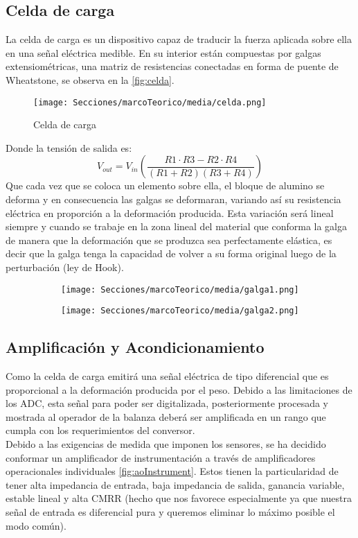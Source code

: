 \subsection{Celda de carga}
La celda de carga es un dispositivo capaz de traducir la fuerza aplicada sobre ella  en una señal eléctrica medible. En su interior están compuestas por galgas extensiométricas, una matriz de resistencias conectadas en forma de puente de Wheatstone, se observa en la \autoref{fig:celda}.
\begin{figure}[H]
    \centering
    \texttt{[image: Secciones/marcoTeorico/media/celda.png]}
    \caption{Celda de carga}
    \label{fig:celda}
\end{figure}
Donde la tensión de salida es:
\begin{equation}\label{eq:VoCelda}
    V_{out} = V_{in} \left(\frac{R1\cdot R3 - R2\cdot R4 }{(R1+R2)(R3+R4)}\right)
\end{equation}
Que cada vez que se coloca un elemento sobre ella, el bloque de alumino se deforma y en consecuencia las galgas se deformaran, variando así su resistencia eléctrica en proporción a la deformación producida. Esta variación será lineal siempre y cuando se trabaje en la zona lineal del material que conforma la galga de manera que la deformación que se produzca sea perfectamente elástica, es decir que la galga tenga la capacidad de volver a su forma original luego de la perturbación (ley de Hook).
\begin{figure}[H]
    \centering
    \begin{subfigure}[b]{0.49\textwidth}
        \texttt{[image: Secciones/marcoTeorico/media/galga1.png]}
        \caption{}
        \label{fig:f1}
    \end{subfigure}
        \begin{subfigure}[b]{0.49\textwidth}
        \texttt{[image: Secciones/marcoTeorico/media/galga2.png]}
        \caption{}
        \label{fig:f2}
    \end{subfigure}
    \caption{}
    \label{fig:galga}
\end{figure}
\subsection{Amplificación y Acondicionamiento}
Como la celda de carga emitirá una señal eléctrica de tipo diferencial que es proporcional a la deformación producida por el peso. Debido a las limitaciones de los ADC, esta señal para poder ser digitalizada, posteriormente procesada y mostrada al operador de la balanza deberá ser amplificada en un rango que cumpla con los requerimientos del conversor.
\\Debido a las exigencias de medida que imponen los sensores, se ha decidido conformar un amplificador de instrumentación a través de amplificadores operacionales individuales \autoref{fig:aoInstrument}. Estos tienen la particularidad de tener alta impedancia de entrada, baja impedancia de salida, ganancia variable, estable lineal y alta CMRR (hecho que nos favorece especialmente ya que nuestra señal de entrada es diferencial pura y queremos eliminar lo máximo posible el modo común).

